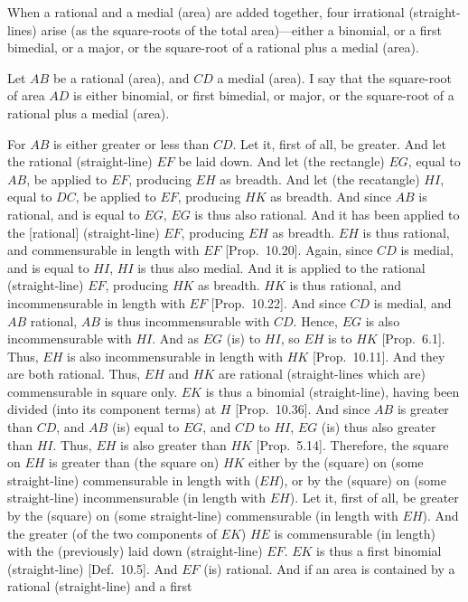 \begin{Parallel}{}{}
{When a rational and a medial (area) are added
together, four irrational (straight-lines) arise (as the square-roots of the
total area)---either a binomial, or a first bimedial, or a major, or the
square-root of a rational plus a medial (area).

Let $AB$ be a rational (area), and $CD$ a medial (area). I say that the
square-root of area $AD$ is either binomial, or first bimedial, or
major, or the square-root of a rational plus a medial (area).

For $AB$ is either greater or less than $CD$. Let it, first of all,
be greater. And let the rational (straight-line) $EF$ be laid down. And
let (the rectangle) $EG$, equal to $AB$, be applied to $EF$,
producing $EH$ as breadth. And let (the recatangle) $HI$, equal to $DC$,
be applied to $EF$, producing $HK$ as breadth. And since
$AB$ is rational, and is equal to $EG$, $EG$ is thus also rational. And it
has been applied to the [rational] (straight-line) $EF$, producing $EH$
as breadth. $EH$ is thus rational, and commensurable in length
with $EF$ [Prop.~10.20]. Again, since
$CD$ is medial, and is equal to $HI$, $HI$ is thus also medial. 
And it is applied to the rational (straight-line) $EF$, producing
$HK$ as breadth. $HK$ is thus rational, and incommensurable
in length with $EF$ [Prop.~10.22]. And since
$CD$ is medial, and $AB$ rational, $AB$ is thus incommensurable
with $CD$. Hence, $EG$ is also incommensurable with $HI$. And
as $EG$ (is) to $HI$, so $EH$ is to $HK$ [Prop.~6.1].
Thus, $EH$ is also incommensurable in length with $HK$
[Prop.~10.11]. And they are both rational. Thus,
$EH$ and $HK$ are rational (straight-lines which are) commensurable in
 square only. $EK$ is thus a binomial (straight-line), having been divided
(into its component terms) at $H$ [Prop.~10.36].
And since $AB$ is greater than $CD$, and $AB$ (is) equal to $EG$, and
$CD$ to $HI$, $EG$ (is) thus also greater than $HI$. Thus, $EH$
is also greater than $HK$ [Prop.~5.14]. Therefore,
 the square on $EH$ is greater than (the square on) $HK$
either by the (square) on (some straight-line) commensurable in length
with ($EH$), or by the (square) on (some straight-line)  incommensurable
(in length with $EH$). 
Let it, first of all, be greater by the (square) on (some straight-line)
commensurable (in length with $EH$). And the greater (of the two components of $EK$) $HE$ is commensurable
(in length) with the (previously) laid down (straight-line) $EF$. $EK$ is thus a first binomial
(straight-line) [Def.~10.5]. And $EF$ (is) rational. And if an area is contained by a rational (straight-line) and a first
}
\end{Parallel}

